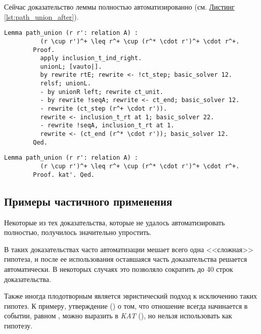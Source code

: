 \documentclass[times
              ]{itmo-student-thesis}
\begin{document}
      Сейчас доказательство леммы полностью автоматизированно (см.
      \hyperref[lst:path_union_after]{Листинг \ref{lst:path_union_after}}).

      \begin{lstlisting}[float=false, gobble=8, label={lst:path_union_before},
        caption={Пример сложного доказательства, которое может быть полностью автоматизированно}]
        Lemma path_union (r r': relation A) :
          (r \cup r')^+ \leq r^+ \cup (r^* \cdot r')^+ \cdot r^+.
        Proof.
          apply inclusion_t_ind_right.
          unionL; [vauto|].
          by rewrite rtE; rewrite <- !ct_step; basic_solver 12.
          relsf; unionL.
          - by unionR left; rewrite ct_unit.
          - by rewrite !seqA; rewrite <- ct_end; basic_solver 12.
          - rewrite (ct_step (r^+ \cdot r')).
          rewrite <- inclusion_t_rt at 1; basic_solver 22.
          - rewrite !seqA, inclusion_t_rt at 1.
          rewrite <- (ct_end (r^* \cdot r')); basic_solver 12.
        Qed.
      \end{lstlisting}

      \begin{lstlisting}[float=false, gobble=8, label={lst:path_union_after},
        caption={Пример полностью автоматизированного доказательства}]
        Lemma path_union (r r': relation A) :
          (r \cup r')^+ \leq r^+ \cup (r^* \cdot r')^+ \cdot r^+.
        Proof. kat'. Qed.
      \end{lstlisting}

    \subsection{Примеры частичного применения }
      Некоторые из тех доказательства, которые не удалось автоматизировать полностью, получилось
      значительно упростить.

      В таких доказательствах часто автоматизации мешает всего одна <<сложная>> гипотеза,
      и после ее использования оставшаяся часть доказательства решается автоматически. В некоторых
      случаях это позволяло сократить до 40 строк доказательства.

      Также иногда плодотворным является эвристический подход к исключению таких гипотез.
      К примеру, утверждение () о том, что отношение  всегда начинается в
      событии, равном , можно выразить в \textit{KAT} (), но нельзя
      использовать как гипотезу.
\end{document}
